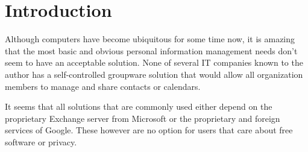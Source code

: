 \documentclass[11pt,a4paper,headsepline,twoside]{scrartcl}		%
\begin{document}
\tableofcontents{}
\newpage{}

\section{Introduction}
\label{sec:introduction}




Although computers have become ubiquitous for some time now, it is amazing that the
most basic and obvious personal information management needs don't seem to have
an acceptable solution. None of several IT companies known to the author has a
self-controlled groupware solution that would allow all organization members to
manage and share contacts or calendars.

It seems that all solutions that are commonly used either depend on the
proprietary Exchange server from Microsoft or the proprietary and foreign
services of Google. These however are no option for users that care about free
software or privacy.



\end{document}
